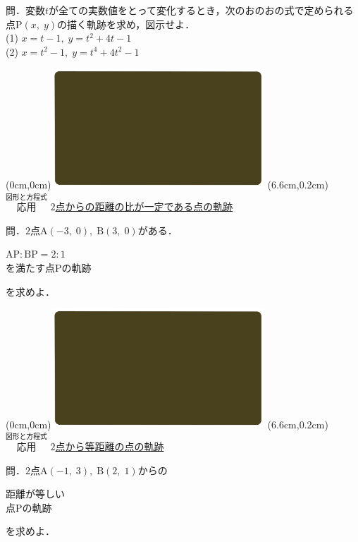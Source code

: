 \documentclass[10pt,
fleqn,
dvipdfmx,
uplatex
]{jsarticle}
\begin{document}
\normalsize 
問．変数$t$が全ての実数値をとって変化するとき，次のおのおの式で定められる点$\text{P}\left(x,\;y\right)$の描く軌跡を求め，図示せよ．\\
(1)  $x=t-1,\;y=t^2+4t-1$\\
(2)  $x=t^2-1,\;y=t^4+4t^2-1$\\



\newpage



\at(0cm,0cm){\includegraphics[width=8cm,bb=0 0 1920 1080]{./youtube/thumbnails/templates/smart_background/図形と方程式.jpeg}}
\at(6.6cm,0.2cm){\small\color{bradorange}$\overset{\text{図形と方程式}}{\text{応用}}$}
{\color{orange}\large\underline{$2$点からの距離の比が一定である点の軌跡}}\vspace{0.3zw}

\large 
問．$2$点$\text{A}\left(-3,\;0\right),\;\text{B}\left(3,\;0\right)$がある．

\huge
\vspace{-0.0zw}
\hspace{0.5zw}$\text{AP}:\text{BP}=2:1$\vspace{-0.0zw}\\
\hfill を満たす点$\text{P}$の軌跡\hspace{0.4zw}

\large 
\vspace{0.2zw}
\hfill を求めよ．


\newpage



\at(0cm,0cm){\includegraphics[width=8cm,bb=0 0 1920 1080]{./youtube/thumbnails/templates/smart_background/図形と方程式.jpeg}}
\at(6.6cm,0.2cm){\small\color{bradorange}$\overset{\text{図形と方程式}}{\text{応用}}$}
{\color{orange}\Large\underline{$2$点から等距離の点の軌跡}}\vspace{0.3zw}

\large 
問．$2$点$\text{A}\left(-1,\;3\right),\;\text{B}\left(2,\;1\right)$からの

\Huge
\vspace{-0.2zw}
\hspace{0.2zw}距離が等しい\vspace{-0.2zw}\\
\hfill 点$\text{P}$の軌跡\hspace{0.2zw}

\large 
\vspace{0.2zw}
\hfill を求めよ．
\end{document}
